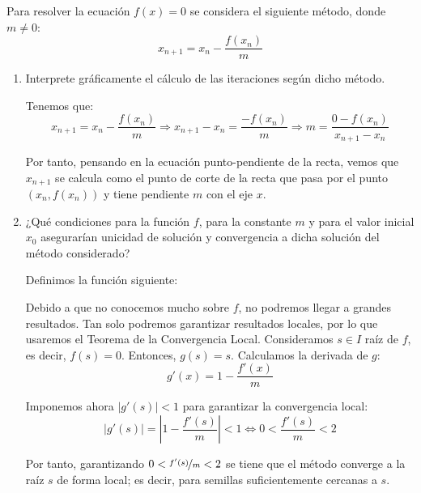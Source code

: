 \begin{ejercicio}\label{ej:1.1.7}
    Para resolver la ecuación $f(x) = 0$ se considera el siguiente método, donde $m \neq 0$:
    $$x_{n+1} = x_n - \frac{f(x_n)}{m}$$
    \begin{enumerate}
        \item Interprete gráficamente el cálculo de las iteraciones según dicho método.
        
        Tenemos que:
        \begin{equation*}
            x_{n+1} = x_n - \frac{f(x_n)}{m}
            \Longrightarrow
            x_{n+1}-x_n  = \frac{-f(x_n)}{m}
            \Longrightarrow
            m = \frac{0-f(x_n)}{x_{n+1}-x_n}
        \end{equation*}

        Por tanto, pensando en la ecuación punto-pendiente de la recta, vemos que $x_{n+1}$ se calcula como el punto de corte de la recta que pasa por el punto $(x_n, f(x_n))$ y tiene pendiente $m$ con el eje $x$.
        \item ¿Qué condiciones para la función $f$, para la constante $m$ y para el valor inicial $x_0$ asegurarían unicidad de solución y convergencia a dicha solución del método considerado?

        Definimos la función siguiente:

        Debido a que no conocemos mucho sobre $f$, no podremos llegar a grandes resultados. Tan solo podremos garantizar resultados locales, por lo que usaremos el Teorema de la Convergencia Local. Consideramos $s\in I$ raíz de $f$, es decir, $f(s)=0$. Entonces, $g(s)=s$. Calculamos la derivada de $g$:
        \begin{equation*}
            g'(x)=1-\frac{f'(x)}{m}
        \end{equation*}

        Imponemos ahora $|g'(s)|<1$ para garantizar la convergencia local:
        \begin{equation*}
            |g'(s)|=\left|1-\frac{f'(s)}{m}\right|<1
            \iff 0<\frac{f'(s)}{m}<2
        \end{equation*}

        Por tanto, garantizando $0<\nicefrac{f'(s)}{m}<2$ se tiene que el método converge a la raíz $s$ de forma local; es decir, para semillas suficientemente cercanas a $s$.
    \end{enumerate}
\end{ejercicio}

